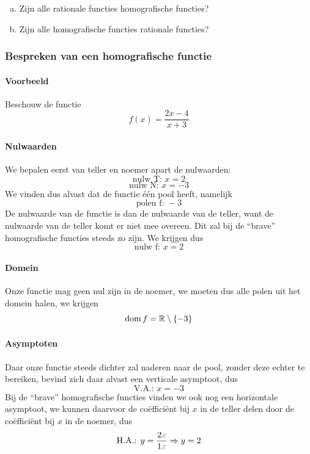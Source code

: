 \documentclass[a4paper,12pt]{article}
\begin{document}
\begin{oefening}
\begin{enumerate}[(a)]
  \item Zijn alle rationale functies homografische functies?
  \item Zijn alle homografische functies rationale functies?
\end{enumerate}
\end{oefening}

\subsubsection*{Bespreken van een homografische functie}

\paragraph{Voorbeeld} Beschouw de functie
$$f(x)=\dfrac{2x-4}{x+3}$$

\paragraph{Nulwaarden} We bepalen eerst van teller en noemer apart de
nulwaarden:
$$\text{nulw T: } x=2$$
$$\text{nulw N: } x=-3$$
We vinden dus alvast dat de functie één pool heeft, namelijk
$$\text{polen f: } -3$$
De nulwaarde van de functie is dan de nulwaarde van de teller, want de
nulwaarde van de teller komt er niet mee overeen. Dit zal bij de
``brave'' homografische functies steeds zo zijn. We krijgen dus
$$\text{nulw f: } x=2$$

\paragraph{Domein} Onze functie mag geen nul zijn in de noemer, we
moeten dus alle polen uit het domein halen, we krijgen
$$\dom f = \mathbb{R} \setminus \{-3\}$$

\paragraph{Asymptoten} Daar onze functie steeds dichter zal naderen
naar de pool, zonder deze echter te bereiken, bevind zich daar alvast
een verticale asymptoot, dus
$$\text{V.A.: } x=-3$$
Bij de ``brave'' homografische functies vinden we ook nog een
horizontale asymptoot, we kunnen daarvoor de coëfficiënt bij $x$ in de
teller delen door de coëfficiënt bij $x$ in de noemer, dus
$$\text{H.A.: } y=\dfrac{2\color{gray}x}{1\color{gray}x} \Rightarrow y=2$$
\end{document}
